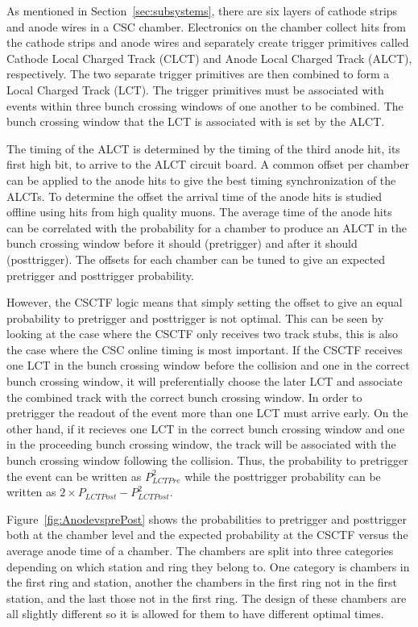 As mentioned in Section~\ref{sec:subsystems}, there are six layers of cathode strips and anode wires in a CSC chamber.
Electronics on the chamber collect hits from the cathode strips and anode wires and separately create trigger primitives called Cathode Local Charged Track (CLCT)
and Anode Local Charged Track (ALCT), respectively. The two separate trigger primitives are then combined to form a Local Charged Track (LCT). The trigger primitives
must be associated with events within three bunch crossing windows of one another to be combined.
The bunch crossing window that the LCT is associated with is set by the ALCT.

The timing of the ALCT is determined by the timing of the third anode hit, its first high bit, 
to arrive to the ALCT circuit board. A common offset per chamber can be applied to the
anode hits to give the best timing synchronization of the ALCTs. To determine the offset the arrival time of the anode hits is studied offline using hits from
high quality muons. The average time of the anode
hits can be correlated with the probability for a chamber to produce an ALCT in the bunch crossing window before it should (pretrigger) and after it should (posttrigger).
The offsets for each chamber can be tuned to give an expected pretrigger and posttrigger probability.

However, the CSCTF logic means that simply setting the offset to give an equal probability to pretrigger and posttrigger is not optimal. This can be seen by looking at
the case where the CSCTF only receives two track stubs, this is also the case where the CSC online timing is most important. If the CSCTF receives one LCT in the bunch
crossing window before the collision and one in the correct bunch crossing window, it will preferentially choose the later LCT and associate the combined track with the correct
bunch crossing window.  In order to pretrigger the readout of the event more than one LCT must arrive early.
On the other hand, if it recieves one LCT in the correct bunch crossing window and one in the proceeding bunch crossing window, the track will be associated with the
bunch crossing window following the collision. Thus, the probability to pretrigger the event can be written as $P_{LCTPre}^2$ while the posttrigger probability can be written as
$2 \times P_{LCTPost} - P_{LCTPost}^2$. 

Figure~\ref{fig:AnodevsprePost} shows the probabilities to pretrigger and posttrigger both at the chamber level and the expected probability at the CSCTF versus
the average anode time of a chamber. The chambers are split into three categories depending on which station and ring they belong to. One category is chambers in the
first ring and station, another the chambers in the first ring not in the first station, and the last those not in the first ring. The design of these chambers are all
slightly different so it is allowed for them to have different optimal times.

